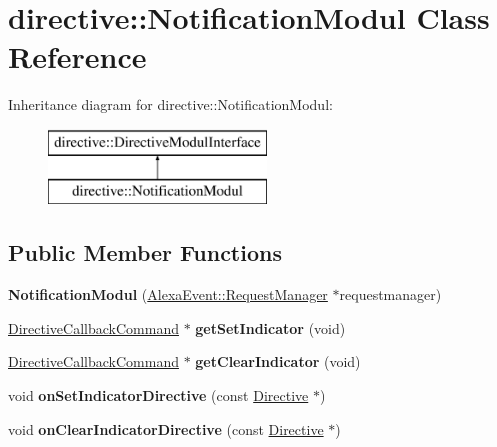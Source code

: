 \hypertarget{classdirective_1_1NotificationModul}{}\section{directive\+:\+:Notification\+Modul Class Reference}
\label{classdirective_1_1NotificationModul}
Inheritance diagram for directive\+:\+:Notification\+Modul\+:\begin{figure}[H]
\begin{center}
\leavevmode
\includegraphics[height=2.000000cm]{df/d63/classdirective_1_1NotificationModul}
\end{center}
\end{figure}
\subsection*{Public Member Functions}
\begin{DoxyCompactItemize}
\item 
\mbox{\label{classdirective_1_1NotificationModul_adec1b506e31c5739517cfa4b6f8c7788}} 
{\bfseries Notification\+Modul} (\hyperlink{classAlexaEvent_1_1RequestManager}{Alexa\+Event\+::\+Request\+Manager} $\ast$requestmanager)
\item 
\mbox{\label{classdirective_1_1NotificationModul_aedc96c10f37317cea47ecafb602fd778}} 
\hyperlink{classdirective_1_1DirectiveCallbackCommand}{Directive\+Callback\+Command} $\ast$ {\bfseries get\+Set\+Indicator} (void)
\item 
\mbox{\label{classdirective_1_1NotificationModul_a53b59d9c8ef900e37b6fe05afe31f3c7}} 
\hyperlink{classdirective_1_1DirectiveCallbackCommand}{Directive\+Callback\+Command} $\ast$ {\bfseries get\+Clear\+Indicator} (void)
\item 
\mbox{\label{classdirective_1_1NotificationModul_a39c9159927468f875573ca351837346e}} 
void {\bfseries on\+Set\+Indicator\+Directive} (const \hyperlink{classdirective_1_1Directive}{Directive} $\ast$)
\item 
\mbox{\label{classdirective_1_1NotificationModul_a2e6483107d062580d10d3f51de596630}} 
void {\bfseries on\+Clear\+Indicator\+Directive} (const \hyperlink{classdirective_1_1Directive}{Directive} $\ast$)
\end{DoxyCompactItemize}
